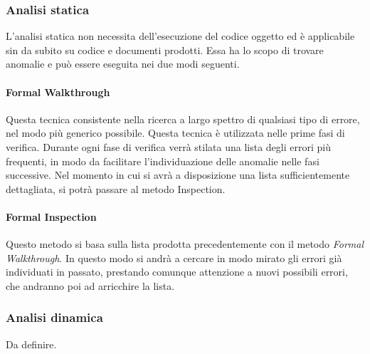 	\subsubsection{Analisi statica}
	L'analisi statica non necessita dell'esecuzione del codice oggetto ed è applicabile sin da subito su codice e documenti prodotti. Essa ha lo scopo di trovare anomalie e può essere eseguita nei due modi seguenti.
	
	\paragraph{Formal Walkthrough}
	Questa tecnica consistente nella ricerca a largo spettro di qualsiasi tipo di errore, nel modo più generico possibile. 
	Questa tecnica è utilizzata nelle prime fasi di verifica. Durante ogni fase di verifica verrà stilata una lista degli errori più frequenti, in modo da facilitare l’individuazione delle anomalie nelle fasi successive. 
	Nel momento in cui si avrà a disposizione una lista sufficientemente dettagliata, si potrà passare al metodo Inspection.
	
	
	\paragraph{Formal Inspection}
	Questo metodo si basa sulla lista prodotta precedentemente con il metodo \textit{Formal Walkthrough}. In questo modo si andrà a cercare in modo mirato gli errori già individuati in passato, prestando comunque attenzione a nuovi possibili errori, che andranno poi ad arricchire la lista.
	
	
	\subsubsection{Analisi dinamica}
	Da definire.
	
	
	
	
	